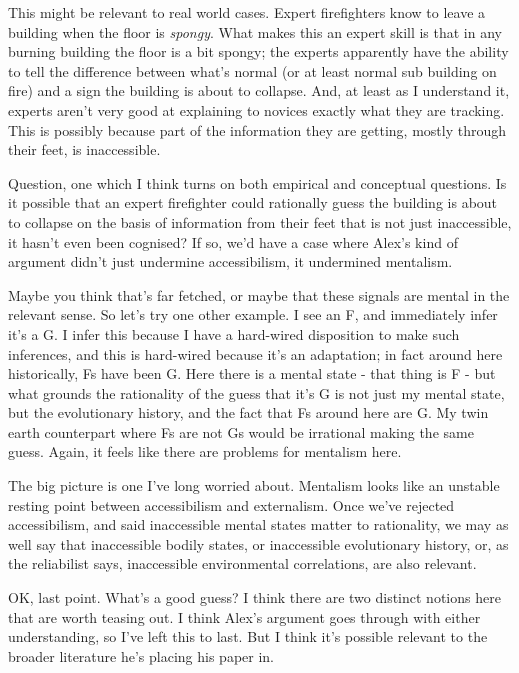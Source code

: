 \documentclass[
  11pt,
  letterpaper,
  DIV=11,
  numbers=noendperiod,
  twoside]{scrartcl}
\begin{document}
This might be relevant to real world cases. Expert firefighters know to
leave a building when the floor is \emph{spongy}. What makes this an
expert skill is that in any burning building the floor is a bit spongy;
the experts apparently have the ability to tell the difference between
what's normal (or at least normal sub building on fire) and a sign the
building is about to collapse. And, at least as I understand it, experts
aren't very good at explaining to novices exactly what they are
tracking. This is possibly because part of the information they are
getting, mostly through their feet, is inaccessible.

Question, one which I think turns on both empirical and conceptual
questions. Is it possible that an expert firefighter could rationally
guess the building is about to collapse on the basis of information from
their feet that is not just inaccessible, it hasn't even been cognised?
If so, we'd have a case where Alex's kind of argument didn't just
undermine accessibilism, it undermined mentalism.

Maybe you think that's far fetched, or maybe that these signals are
mental in the relevant sense. So let's try one other example. I see an
F, and immediately infer it's a G. I infer this because I have a
hard-wired disposition to make such inferences, and this is hard-wired
because it's an adaptation; in fact around here historically, Fs have
been G. Here there is a mental state - that thing is F - but what
grounds the rationality of the guess that it's G is not just my mental
state, but the evolutionary history, and the fact that Fs around here
are G. My twin earth counterpart where Fs are not Gs would be irrational
making the same guess. Again, it feels like there are problems for
mentalism here.

The big picture is one I've long worried about. Mentalism looks like an
unstable resting point between accessibilism and externalism. Once we've
rejected accessibilism, and said inaccessible mental states matter to
rationality, we may as well say that inaccessible bodily states, or
inaccessible evolutionary history, or, as the reliabilist says,
inaccessible environmental correlations, are also relevant.

OK, last point. What's a good guess? I think there are two distinct
notions here that are worth teasing out. I think Alex's argument goes
through with either understanding, so I've left this to last. But I
think it's possible relevant to the broader literature he's placing his
paper in.
\end{document}
